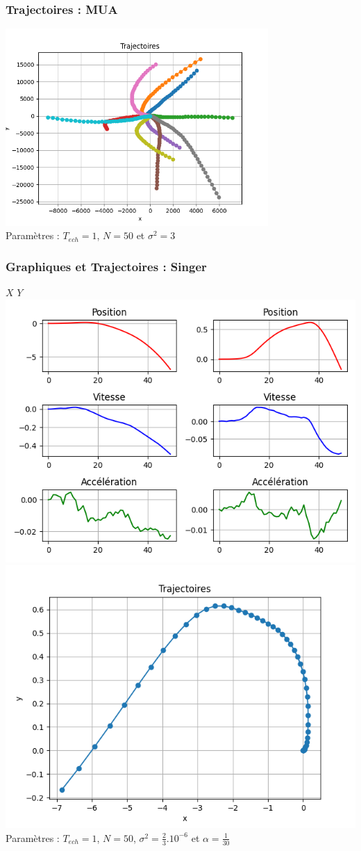 \documentclass{beamer}
\begin{document}
\begin{frame}
  \frametitle{Trajectoires : MUA}
  \includegraphics[width=0.75\textwidth]{images/MUA_Trajectoires.png} \\
  Paramètres : $T_{ech} = 1$, $N = 50$ et $\sigma^{2} = 3$
\end{frame}

\begin{frame}
  \frametitle{Graphiques et Trajectoires : Singer}
  \hspace{1,4cm} $X$ \hspace{2,5cm} $Y$ \\
  \includegraphics[width=.5\textwidth]{images/SINGER_Générations_1.png}\hfill
  \includegraphics[width=.5\textwidth]{images/SINGER_Trajectoire_1.png} 
  Paramètres : $T_{ech} = 1$, $N = 50$, $\sigma^{2} = \frac{2}{3}.10^{-6}$ et $\alpha = \frac{1}{30}$
\end{frame}
\end{document}

